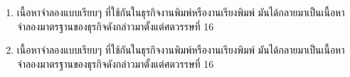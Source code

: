 \begin{statementthai}
\setlength{\parskip}{12pt}
\setlength{\parindent}{10mm}
\begin{spacing}{1.5}
\normalsize

\begin{enumerate}[leftmargin=*, labelsep=6.5mm] 

\item \fontsize{16}{19.2}\selectfont เนื้อหาจำลองแบบเรียบๆ ที่ใช้กันในธุรกิจงานพิมพ์หรืองานเรียงพิมพ์ มันได้กลายมาเป็นเนื้อหาจำลองมาตรฐานของธุรกิจดังกล่าวมาตั้งแต่ศตวรรษที่ 16

\item เนื้อหาจำลองแบบเรียบๆ ที่ใช้กันในธุรกิจงานพิมพ์หรืองานเรียงพิมพ์ มันได้กลายมาเป็นเนื้อหาจำลองมาตรฐานของธุรกิจดังกล่าวมาตั้งแต่ศตวรรษที่ 16


\end{enumerate}
\normalsize
\end{spacing}
\end{statementthai}
